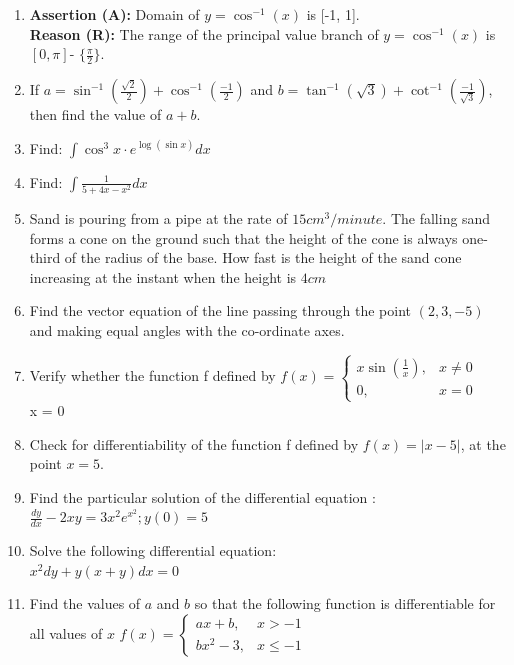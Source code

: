 \documentclass{article}
\begin{document}
\begin{enumerate}
	\item \textbf{Assertion (A):} Domain of $ y = \cos^{-1}(x) $ is [-1, 1].\\
		\textbf{Reason (R):} The range of the principal value branch of $ y = \cos^{-1}(x) $ is $[0, \pi]$- $\{\frac{\pi}{2}\}$.


\item If $ a = \sin^{-1}\left(\frac{\sqrt{2}}{2}\right) + \cos^{-1}\left(\frac{-1}{2}\right) $ and $ b = \tan^{-1}(\sqrt{3}) + \cot^{-1}\left(\frac{-1}{\sqrt{3}}\right) $, then find the value of $a + b$.


\item Find: $\int \cos^3  x \cdot e^{\log(\sin x)}dx$

\item Find: $\int \frac{1}{5+4x-x^2}dx$	

\item Sand is pouring from a pipe at the rate of $ 15 cm^3/minute$. The falling sand forms a cone on the ground such that the height of the cone is always one- third of the radius of the base. How fast is the height of the sand cone increasing at the instant when the height is $4cm$	 

\item Find the vector equation of the line passing through the point $(2, 3, -5)$ and making equal angles with the co-ordinate axes.

\item Verify whether the function f defined by $f(x) = \begin{cases} x \sin{\left(\frac{1}{x}\right)}, & x \neq 0 \\ 0, & x = 0 \end{cases} $\\
 x = 0 


\item Check for differentiability  of the function f defined by $f(x) = |x-5|$, at the point $x = 5$.


\item Find the particular solution of the  differential equation : \\
	$ \frac{dy}{dx} - 2xy = 3x^2e^{x^2} ; y(0)=5 $

\item Solve the following differential equation:\\
	$x^2 dy+y(x+y)dx=0$

\item Find the values of $a$ and $b$ so that the following function is differentiable for all values of $x$  $f(x) = \begin{cases} ax+b, & x>-1 \\ bx^2-3, & x\le -1 \end{cases} $


\end{enumerate}
\end{document}
